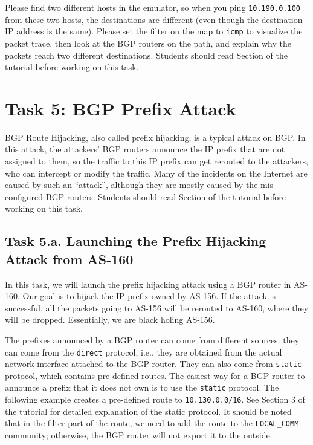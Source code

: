 Please find two different hosts in the emulator, so 
when you ping \texttt{10.190.0.100} from these two hosts, 
the destinations are different (even though the destination
IP address is the same). Please set the filter on the map to
\texttt{icmp} to visualize the packet trace, then 
look at the BGP routers on the path, and explain why
the packets reach two different destinations. 
Students should read Section \ipanycast of the tutorial 
before working on this task.



\section{Task 5: BGP Prefix Attack} 

BGP Route Hijacking, also called prefix hijacking, is a typical
attack on BGP. In this attack, the attackers' BGP routers 
announce the IP prefix that are not assigned to them, so
the traffic to this IP prefix can get rerouted to the 
attackers, who can intercept or modify the traffic.
Many of the incidents on the Internet are caused by
such an ``attack'', although they are mostly caused 
by the mis-configured BGP routers.
Students should read Section \bgphijacking of the tutorial 
before working on this task.


\subsection{Task 5.a. Launching the Prefix Hijacking Attack from AS-160} 

In this task, we will launch the prefix hijacking attack
using a BGP router in AS-160. Our goal is to hijack
the IP prefix owned by AS-156. If the attack is successful,
all the packets going to AS-156 will be rerouted to AS-160, where
they will be dropped. Essentially, we are black holing AS-156.

The prefixes announced by a BGP router can come from different 
sources: they can come from the \texttt{direct} protocol, 
i.e., they are obtained from the actual network interface attached
to the BGP router. They can also come from \texttt{static} protocol,
which contains pre-defined routes. The easiest way for a BGP router to 
announce a prefix that it does not own is to use 
the \texttt{static} protocol. The following  
example creates a pre-defined route to \texttt{10.130.0.0/16}. 
See Section 3 of the tutorial for detailed explanation of the static protocol.
It should be noted that in the filter part of the route,
we need to add the route to the \texttt{LOCAL\_COMM} community; 
otherwise, the BGP router will not export it to the outside.   

